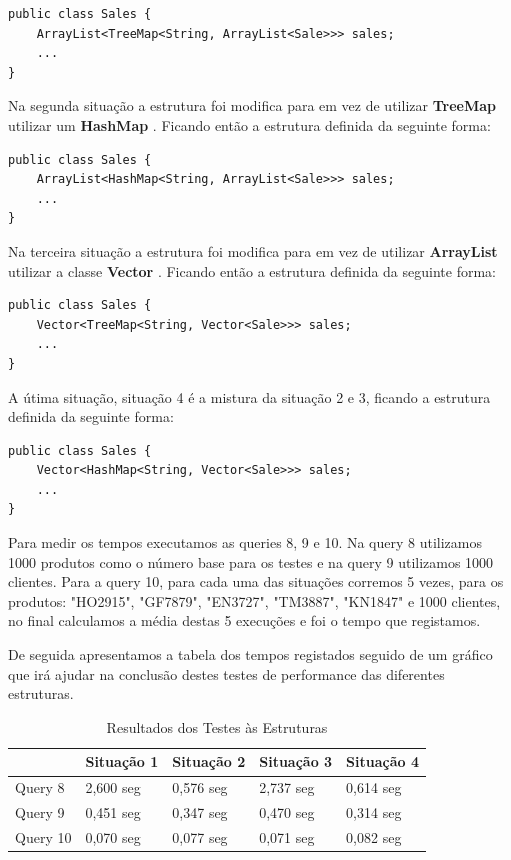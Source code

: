 \documentclass[10pt] {article}
\begin{document}
\begin{lstlisting}
public class Sales {
	ArrayList<TreeMap<String, ArrayList<Sale>>> sales;
	...
}
\end{lstlisting}

\par Na segunda situação a estrutura foi modifica para em vez de utilizar \color{blue} \textbf{TreeMap} \color{black} utilizar um
\color{blue} \textbf{HashMap} \color{black} . Ficando então a estrutura definida da seguinte forma:

\begin{lstlisting}
public class Sales {
	ArrayList<HashMap<String, ArrayList<Sale>>> sales;
	...
}
\end{lstlisting}

\par Na terceira situação a estrutura foi modifica para em vez de utilizar \color{blue} \textbf{ArrayList} \color{black} utilizar a
classe  \color{blue} \textbf{Vector} \color{black} . Ficando então a estrutura definida da seguinte forma:

\begin{lstlisting}
public class Sales {
	Vector<TreeMap<String, Vector<Sale>>> sales;
	...
}
\end{lstlisting}

\par A útima situação, situação 4 é a mistura da situação 2 e 3, ficando a estrutura definida da seguinte forma:

\begin{lstlisting}
public class Sales {
	Vector<HashMap<String, Vector<Sale>>> sales;
	...
}
\end{lstlisting}

\par Para medir os tempos executamos as queries 8, 9 e 10. Na query 8 utilizamos 1000 produtos como o número base
para os testes e na query 9 utilizamos 1000 clientes. Para a query 10, para cada uma das situações corremos 5 vezes,
para os produtos: "HO2915", "GF7879", "EN3727", "TM3887", "KN1847" e 1000 clientes, no final calculamos a média destas 5
execuções e foi o tempo que registamos.
\par De seguida apresentamos a tabela dos tempos registados seguido de um gráfico que irá ajudar na conclusão destes
testes de performance das diferentes estruturas.

\newpage

\begin{table}[h]
\centering
\caption{Resultados dos Testes às Estruturas}
\begin{tabular}{l|l|l|l|l|}
\cline{2-5}
                               & Situação 1 & Situação 2 & Situação 3 & Situação 4 \\ \hline
\multicolumn{1}{|l|}{Query 8}  & 2,600 seg  & 0,576 seg  & 2,737 seg  & 0,614 seg  \\ \hline
\multicolumn{1}{|l|}{Query 9}  & 0,451 seg  & 0,347 seg  & 0,470 seg  & 0,314 seg  \\ \hline
\multicolumn{1}{|l|}{Query 10} & 0,070 seg  & 0,077 seg  & 0,071 seg  & 0,082 seg  \\ \hline
\end{tabular}
\end{table}
\end{document}
